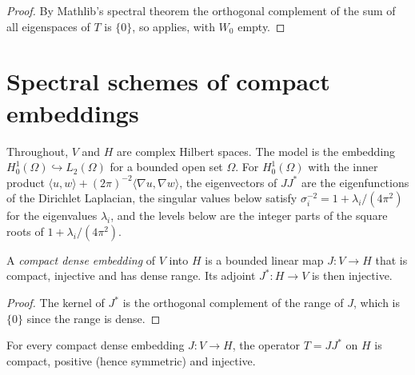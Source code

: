\begin{proof}
\leanok
By Mathlib's spectral theorem the orthogonal complement of the sum of all eigenspaces of $T$ is
$\{0\}$, so  applies, with $W_0$ empty.
\end{proof}

\section{Spectral schemes of compact embeddings}
\label{sec:compact-embedding-schemes}

Throughout, $V$ and $H$ are complex Hilbert spaces. The model is the embedding
$H^1_0(\Omega) \hookrightarrow L_2(\Omega)$ for a bounded open set $\Omega$. For $H^1_0(\Omega)$
with the inner product $\langle u, w \rangle + (2\pi)^{-2} \langle \nabla u, \nabla w \rangle$,
the eigenvectors of $J J^*$ are the eigenfunctions of the Dirichlet Laplacian, the singular
values below satisfy $\sigma_i^{-2} = 1 + \lambda_i/(4\pi^2)$ for the eigenvalues $\lambda_i$,
and the levels below are the integer parts of the square roots of $1 + \lambda_i/(4\pi^2)$.

\begin{definition}
\label{def:compact-dense-embedding}
\leanok
A \emph{compact dense embedding} of $V$ into $H$ is a bounded linear map $J : V \to H$ that is
compact, injective and has dense range. Its adjoint $J^* : H \to V$ is then injective.
\end{definition}

\begin{proof}
\leanok
The kernel of $J^*$ is the orthogonal complement of the range of $J$, which is $\{0\}$ since
the range is dense.
\end{proof}

\begin{lemma}
\label{lem:gram-operator}
\leanok
{}
For every compact dense embedding $J : V \to H$, the operator $T = J J^*$ on $H$ is compact,
positive (hence symmetric) and injective.
\end{lemma}

